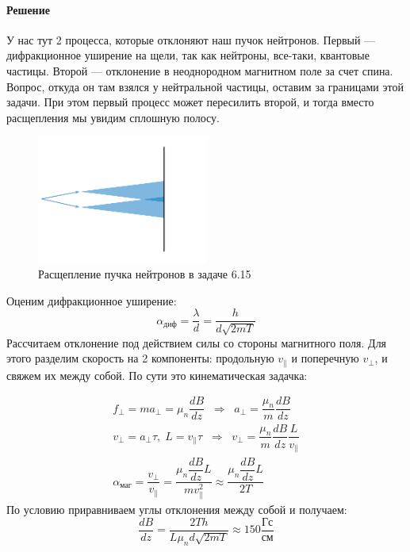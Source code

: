 \documentclass[12pt]{article}
\begin{document}
\paragraph{Решение}
У нас тут 2 процесса, которые отклоняют наш пучок нейтронов. Первый --- дифракционное уширение на щели, так как нейтроны, все-таки, квантовые частицы. Второй --- отклонение в неоднородном магнитном поле за счет спина. Вопрос, откуда он там взялся у нейтральной частицы, оставим за границами этой задачи. При этом первый процесс может пересилить второй, и тогда вместо расщепления мы увидим сплошную полосу. 
\begin{figure}[h]
    \centering
    \includegraphics[width=0.5\textwidth,height=\textheight,keepaspectratio]{Seminar_07/pics/pic_03.pdf}
    \caption{Расщепление пучка нейтронов в задаче 6.15}
    \label{fig:sem_7_neutron_beam}
\end{figure}

\noindent
Оценим дифракционное уширение:
\begin{equation*}
    \alpha_{\text{диф}}= \dfrac{\lambda}{d} = \dfrac{h}{d\sqrt{2mT}}
\end{equation*}
Рассчитаем отклонение под действием силы со стороны магнитного поля. Для этого разделим скорость на 2 компоненты: продольную $v_{\parallel}$ и поперечную $v_{\perp}$, и свяжем их между собой. По сути это кинематическая задачка:

\begin{gather*}
    f_{\perp} =m a_{\perp} = \mu_n \dfrac{dB}{dz} \;\; \Rightarrow \;\; a_{\perp} = \dfrac{\mu_n}{m} \dfrac{dB}{dz}\\
    v_{\perp} = a_{\perp} \tau, \; L=v_{\parallel}\tau \;\; \Rightarrow \;\; v_{\perp} = \dfrac{\mu_n}{m} \dfrac{dB}{dz} \dfrac{L}{v_{\parallel}}\\
    \alpha_{\text{маг}}= \dfrac{v_{\perp}}{v_{\parallel}} = \dfrac{\mu_n \dfrac{dB}{dz} L}{mv^2_{\parallel}} \approx \dfrac{\mu_n \dfrac{dB}{dz} L}{2T}
\end{gather*}
По условию приравниваем углы отклонения между собой и получаем:
\begin{equation*}
    \dfrac{dB}{dz} = \dfrac{2Th}{L\mu_nd\sqrt{2mT}} \approx 150 \dfrac{\text{Гс}}{\text{см}}
\end{equation*}
\end{document}
